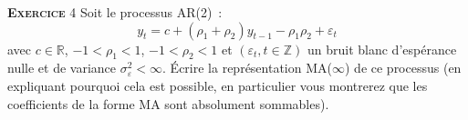 \documentclass[10pt,a4paper,notitlepage,twocolumn]{article}
\newcommand{\exercice}[1]{\textsc{\textbf{Exercice}} #1}
\begin{document}
\bigskip
\bigskip

\exercice{4} Soit le processus AR(2)~:
\[
  y_t = c + (\rho_1+\rho_2)y_{t-1} - \rho_1\rho_2 + \varepsilon_t
\]
avec $c\in\mathbb R$, $-1<\rho_1<1$, $-1<\rho_2<1$ et
$(\varepsilon_t, t\in \mathbb Z)$ un bruit blanc d'espérance nulle et de
variance $\sigma_{\varepsilon}^2<\infty$. Écrire la représentation MA($\infty$)
de ce processus (en expliquant pourquoi cela est possible, en particulier vous
montrerez que les coefficients de la forme MA sont absolument sommables).
\end{document}
